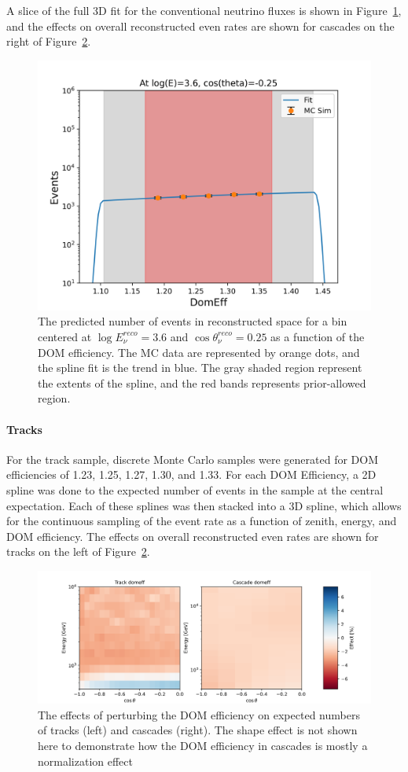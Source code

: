 \documentclass[main.tex]{subfiles}
\begin{document}
A slice of the full 3D fit for the conventional neutrino fluxes is shown in Figure~\ref{fig:domeff_fit}, and the effects on overall reconstructed even rates are shown for cascades on the right of Figure~\ref{fig:domeff_analysis}.
\begin{figure}
    \centering
    \includegraphics[width=0.75\linewidth]{figures/atmConv_logE_3.6_cosz_-0.25.png}
    \caption{The predicted number of events in reconstructed space for a bin centered at $\log E_{\nu}^{reco}=3.6$ and $\cos\theta_{\nu}^{reco}=0.25$ as a function of the DOM efficiency. The MC data are represented by orange dots, and the spline fit is the trend in blue. The gray shaded region represent the extents of the spline, and the red bands represents prior-allowed region.}\label{fig:domeff_fit}
\end{figure}




\paragraph{Tracks}

For the track sample, discrete Monte Carlo samples were generated for DOM efficiencies of 1.23, 1.25, 1.27, 1.30, and 1.33. 
For each DOM Efficiency, a 2D spline was done to the expected number of events in the sample at the central expectation. 
Each of these splines was then stacked into a 3D spline, which allows for the continuous sampling of the event rate as a function of zenith, energy, and DOM efficiency. 
The effects on overall reconstructed even rates are shown for tracks on the left of Figure~\ref{fig:domeff_analysis}.

\begin{figure}
    \centering
    \includegraphics[width=0.8\linewidth]{figures/systematics/domeff.png}
    \caption{The effects of perturbing the DOM efficiency on expected numbers of tracks (left) and cascades (right). The shape effect is not shown here to demonstrate how the DOM efficiency in cascades is mostly a normalization effect}\label{fig:domeff_analysis}
\end{figure}
\end{document}
